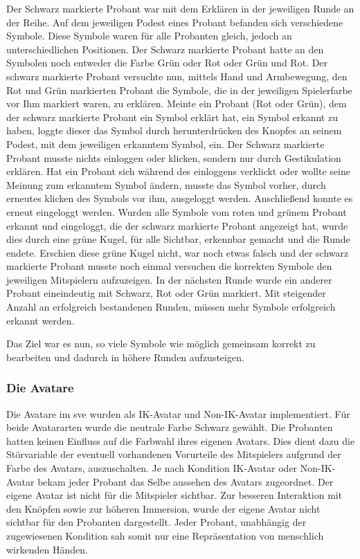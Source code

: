 \documentclass[a4paper,11pt]{article}%
\renewcommand{\\}{\vspace*{0.5\baselineskip} \newline}
\begin{document}
Der Schwarz markierte Probant war mit dem Erklären in der jeweiligen Runde an der Reihe.
Auf dem jeweiligen Podest eines Probant befanden sich verschiedene Symbole. Diese Symbole waren für alle Probanten gleich, jedoch an unterschiedlichen Positionen. Der Schwarz markierte Probant hatte an den Symbolen noch entweder die Farbe \dq{}Grün oder Rot\dq{} oder \dq{}Grün und Rot\dq{}.
Der schwarz markierte Probant versuchte nun, mittels Hand und Armbewegung, den Rot und Grün markierten Probant die Symbole, die in der jeweiligen Spielerfarbe vor Ihm markiert waren, zu erklären.
Meinte ein Probant (Rot oder Grün), dem der schwarz markierte Probant ein Symbol erklärt hat, ein Symbol erkannt zu haben, loggte dieser das Symbol durch herunterdrücken des Knopfes an seinem Podest, mit dem jeweiligen erkanntem Symbol, ein. Der Schwarz markierte Probant musste nichts einloggen oder klicken, sondern nur durch Gestikulation erklären.
Hat ein Probant sich während des einloggens verklickt oder wollte seine Meinung zum erkanntem Symbol ändern, musste das Symbol vorher, durch erneutes klicken des Symbols vor ihm, ausgeloggt werden. Anschließend konnte es erneut eingeloggt werden.
Wurden alle Symbole vom roten und grünem Probant erkannt und eingeloggt, die der schwarz markierte Probant angezeigt hat, wurde dies durch eine grüne Kugel, für alle Sichtbar, erkennbar gemacht und die Runde endete. Erschien diese grüne Kugel nicht, war noch etwas falsch und der schwarz markierte Probant musste noch einmal versuchen die korrekten Symbole den jeweiligen Mitspielern aufzuzeigen.
In der nächsten Runde wurde ein anderer Probant eineindeutig mit Schwarz, Rot oder Grün markiert.
Mit steigender Anzahl an erfolgreich bestandenen Runden, müssen mehr Symbole erfolgreich erkannt werden.

Das Ziel war es nun, so viele Symbole wie möglich gemeinsam korrekt zu bearbeiten und dadurch in höhere Runden aufzusteigen.

	\subsubsection{Die Avatare}
Die Avatare im \ac{sve} wurden als \dq{}IK-Avatar\dq{} und \dq{}Non-IK-Avatar\dq{} implementiert.
Für beide Avatararten wurde die neutrale Farbe Schwarz gewählt. Die Probanten hatten keinen Einfluss auf die Farbwahl ihres eigenen Avatars. Dies dient dazu die Störvariable der eventuell vorhandenen Vorurteile des Mitspielers aufgrund der Farbe des Avatars, auszuschalten. Je nach Kondition \dq{}IK-Avatar\dq{} oder \dq{}Non-IK-Avatar\dq{} bekam jeder Probant das Selbe aussehen des Avatars zugeordnet. Der eigene Avatar ist nicht für die Mitspieler sichtbar. Zur besseren Interaktion mit den Knöpfen sowie zur höheren Immersion, wurde der eigene Avatar nicht sichtbar für den Probanten dargestellt. Jeder Probant, unabhängig der zugewiesenen Kondition sah somit nur eine Repräsentation von menschlich wirkenden Händen.
\end{document}
